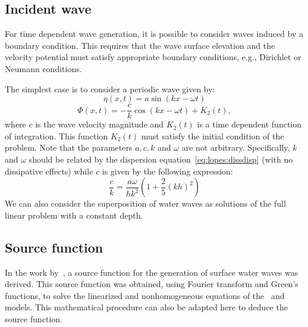 \subsection{Incident wave}

For time dependent wave generation, it is possible to consider waves
induced by a boundary condition.  This requires that the wave surface
elevation and the velocity potential must satisfy appropriate boundary
conditions, e.g., Dirichlet or Neumann conditions.

The simplest case is to consider a periodic wave given by:
\begin{equation}
  \label{eq:lopes:dirichleteta}
  \eta(x,t)=a \sin(kx-\omega t)
\end{equation}
\begin{equation}
  \label{eq:lopes:dirichletphi}
  \Phi(x,t)=-\frac{c}{k}\cos(k x-\omega t)+K_2(t),
\end{equation}
where $c$ is the wave velocity magnitude and $K_2(t)$ is a time
dependent function of integration.  This function $K_2(t)$ must
satisfy the initial condition of the problem.  Note that the
parameters $a,c,k$ and $\omega$ are not arbitrary. Specifically, $k$
and $\omega$ should be related by the dispersion
equation~\eqref{eq:lopes:dissdisp} (with no dissipative effects) while
$c$ is given by the following expression:
\begin{equation}
  \frac{c}{k}=\frac{a\omega}{hk^2}\left(1+\frac{2}{5}(kh)^2\right)
\end{equation}
We can also consider the superposition of water waves as solutions of
the full linear problem with a constant depth.

\subsection{Source function}

In the work by~\citet{WeiKirbySinha1999}, a source
function for the generation of surface water
waves was derived.  This source function was obtained, using Fourier
transform and Green's functions, to solve the linearized and
nonhomogeneous equations of the~\citet{Peregrine1967}
and~\citet{Nwogu1993} models.  This mathematical procedure can also be
adapted here to deduce the source function.

